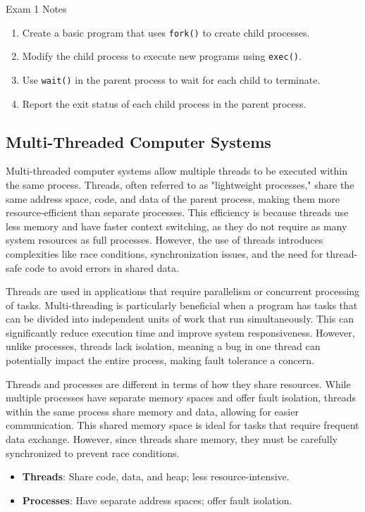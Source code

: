 \begin{examnotes}{Exam 1 Notes}
    \begin{highlight}
        \begin{enumerate}
            \item Create a basic program that uses \texttt{fork()} to create child processes.
            \item Modify the child process to execute new programs using \texttt{exec()}.
            \item Use \texttt{wait()} in the parent process to wait for each child to terminate.
            \item Report the exit status of each child process in the parent process.
        \end{enumerate}
    \end{highlight}

    \subsection*{Multi-Threaded Computer Systems}

    Multi-threaded computer systems allow multiple threads to be executed within the same process. Threads, often referred to as "lightweight processes," share the same address space, code, and data of 
    the parent process, making them more resource-efficient than separate processes. This efficiency is because threads use less memory and have faster context switching, as they do not require as many 
    system resources as full processes. However, the use of threads introduces complexities like race conditions, synchronization issues, and the need for thread-safe code to avoid errors in shared data.
    
    Threads are used in applications that require parallelism or concurrent processing of tasks. Multi-threading is particularly beneficial when a program has tasks that can be divided into independent 
    units of work that run simultaneously. This can significantly reduce execution time and improve system responsiveness. However, unlike processes, threads lack isolation, meaning a bug in one thread 
    can potentially impact the entire process, making fault tolerance a concern.
    
    \begin{highlight}
        Threads and processes are different in terms of how they share resources. While multiple processes have separate memory spaces and offer fault isolation, threads within the same process share 
        memory and data, allowing for easier communication. This shared memory space is ideal for tasks that require frequent data exchange. However, since threads share memory, they must be carefully 
        synchronized to prevent race conditions.
        \begin{itemize}
            \item \textbf{Threads}: Share code, data, and heap; less resource-intensive.
            \item \textbf{Processes}: Have separate address spaces; offer fault isolation.
        \end{itemize}
    \end{highlight}
    

\end{examnotes}
